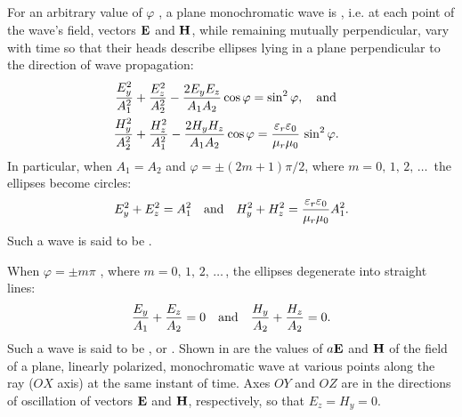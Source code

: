 \subsection{}\label{31.1.7} For an arbitrary value of $\varphi$ , a plane monochromatic wave is , i.e. at each point of the wave's field, vectors $\vb{E}$ and $\vb{H}$, while remaining mutually perpendicular,
vary with time so that their heads describe ellipses lying in a
plane perpendicular to the direction of wave propagation:
\begin{align*}%
\frac{E_{y}^{2}}{A_{1}^{2}} & +\frac{E_{z}^{2}}{A_{2}^{2}}  - \frac{2 E_{y}E_{z}}{A_{1}A_{2}} \cos \varphi = \sin^{2} \varphi, \qand \\
\frac{H_{y}^{2}}{A_{2}^{2}} & +\frac{H_{z}^{2}}{A_{1}^{2}}  - \frac{2 H_{y}H_{z}}{A_{1}A_{2}} \cos \varphi = \frac{\varepsilon_{r} \varepsilon_{0}}{\mu_{r} \mu_{0}} \, \sin^{2} \varphi.
\end{align*}
In particular, when $A_{1} = A_{2}$ and $\varphi = \pm (2m + 1) \pi/2$, where $m = 0, \,1,\, 2,\,\ldots{\,}$ the ellipses become circles:
\begin{equation*}%
E_{y}^{2} + E_{z}^{2} = A_{1}^{2} \qand  H_{y}^{2} + H_{z}^{2} = \frac{\varepsilon_{r} \varepsilon_{0}}{\mu_{r} \mu_{0}} A_{1}^{2}.
\end{equation*}
Such a wave is said to be .



When $\varphi = \pm m \pi$ , where $m = 0,\, 1,\, 2,\, \ldots{\,}$, the ellipses degenerate into straight lines:
\begin{equation*}%
\frac{E_{y}}{A_{1}} + \frac{E_{z}}{A_{2}}= 0 \qand \frac{H_{y}}{A_{2}} + \frac{H_{z}}{A_{2}}= 0.
\end{equation*}
Such a wave is said to be , or . Shown in  are the values of $ a\vb{E}$ and $\vb{H}$ of the field of a plane, linearly polarized, monochromatic wave at various points along the ray ($OX$ axis) at the same instant of time. Axes $OY$ and $OZ$ are in the directions of oscillation of vectors $\vb{E}$ and $\vb{H}$, respectively, so that $E_{z} = H_{y} = 0$. 

